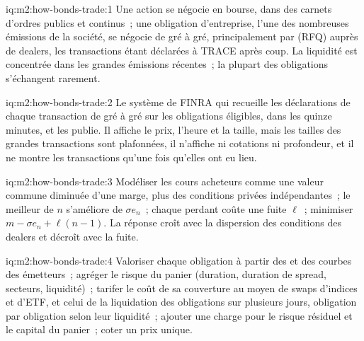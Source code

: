 \begin{solution}{iq:m2:how-bonds-trade:1}
Une action se négocie en bourse, dans des carnets d'ordres publics et continus~; une obligation d'entreprise,
l'une des nombreuses émissions de la société, se négocie de gré à gré, principalement par  (RFQ) auprès de dealers, les transactions étant déclarées à TRACE après coup. La liquidité est
concentrée dans les grandes émissions récentes~; la plupart des obligations s'échangent rarement.
\end{solution}

\begin{solution}{iq:m2:how-bonds-trade:2}
Le système de FINRA qui recueille les déclarations de chaque transaction de gré à gré sur les obligations
éligibles, dans les quinze minutes, et les publie. Il affiche le prix, l'heure et la taille, mais les tailles des grandes
transactions sont plafonnées, il n'affiche ni cotations ni profondeur, et il ne montre les transactions
qu'une fois qu'elles ont eu lieu.
\end{solution}

\begin{solution}{iq:m2:how-bonds-trade:3}
Modéliser les cours acheteurs comme une valeur commune diminuée d'une marge, plus des conditions privées indépendantes~; le meilleur
de $n$ s'améliore de $\sigma e_n$~; chaque perdant coûte une fuite $\ell$~; minimiser
$m - \sigma e_n + \ell(n-1)$. La réponse croît avec la dispersion des conditions des dealers
et décroît avec la fuite.
\end{solution}

\begin{solution}{iq:m2:how-bonds-trade:4}
Valoriser chaque obligation à partir des  et des courbes des émetteurs~; agréger le risque du panier
(duration, duration de spread, secteurs, liquidité)~; tarifer le coût de sa couverture au moyen de
swaps d'indices et d'ETF, et celui de la liquidation des obligations sur plusieurs jours, obligation par obligation selon
leur liquidité~; ajouter une charge pour le risque résiduel et le capital du panier~; coter un
prix unique.
\end{solution}

